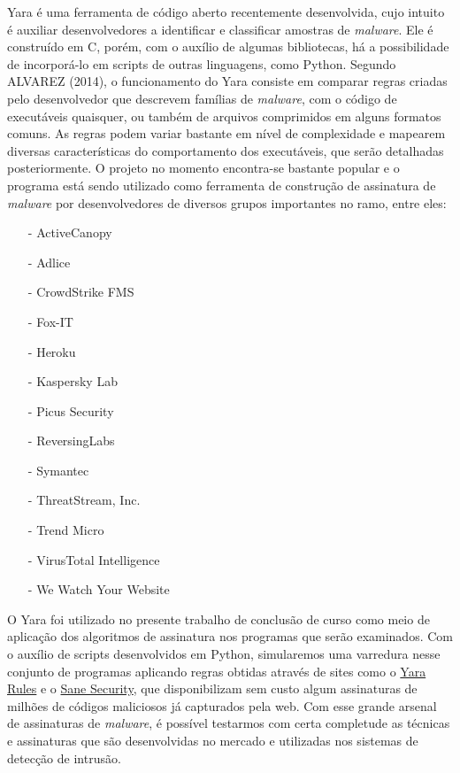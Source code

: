 Yara é uma ferramenta de código aberto recentemente desenvolvida, cujo intuito é
auxiliar desenvolvedores a identificar e classificar amostras de
\textit{malware}. Ele é construído em C, porém, com o auxílio de algumas
bibliotecas, há a possibilidade de incorporá-lo em scripts de outras linguagens,
como Python. Segundo ALVAREZ (2014), o funcionamento do Yara consiste em comparar
regras criadas pelo desenvolvedor que descrevem famílias de \textit{malware},
com o código de executáveis quaisquer, ou também de arquivos comprimidos em
alguns formatos comuns. As regras podem variar bastante em nível de complexidade
e mapearem diversas características do comportamento dos executáveis, que serão
detalhadas posteriormente. O projeto no momento encontra-se bastante popular e o
programa está sendo utilizado como ferramenta de construção de assinatura de
\textit{malware} por desenvolvedores de diversos grupos importantes no ramo,
entre eles:
\begin{itemize}
	\item[-] ActiveCanopy
	\item[-] Adlice
	\item[-] CrowdStrike FMS
	\item[-] Fox-IT
	\item[-] Heroku
	\item[-] Kaspersky Lab
	\item[-] Picus Security
	\item[-] ReversingLabs
	\item[-] Symantec
	\item[-] ThreatStream, Inc.
	\item[-] Trend Micro
	\item[-] VirusTotal Intelligence
	\item[-] We Watch Your Website
\end{itemize}

O Yara foi utilizado no presente trabalho de conclusão de curso como meio de
aplicação dos algoritmos de assinatura nos programas que serão examinados. Com
o auxílio de scripts desenvolvidos em Python, simularemos uma varredura nesse
conjunto de programas aplicando regras obtidas através de sites como o
\href{yararules.org}{Yara Rules} e o
\href{http://sanesecurity.com/usage/signatures/}{Sane Security}, que
disponibilizam sem custo algum assinaturas de milhões de códigos maliciosos já
capturados pela web. Com esse grande arsenal de assinaturas de \textit{malware}, é
possível testarmos com certa completude as técnicas e assinaturas que são
desenvolvidas no mercado e utilizadas nos sistemas de detecção de intrusão.

